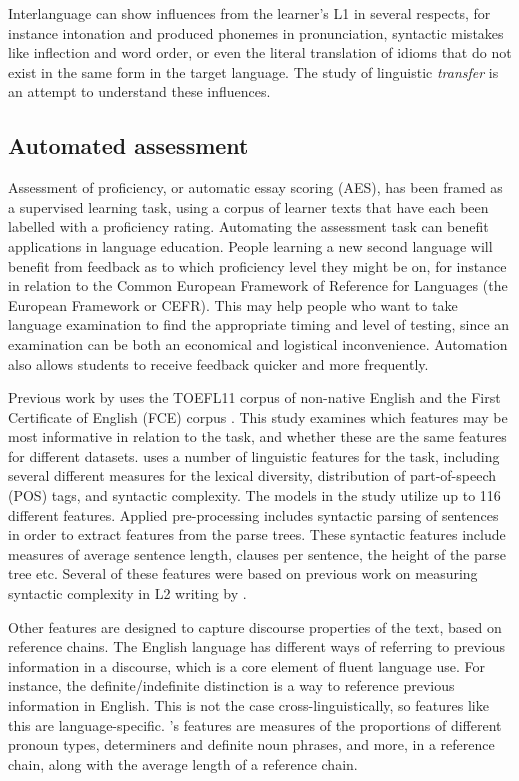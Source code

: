 Interlanguage can show influences from the learner's L1 in several respects,
for instance intonation and produced phonemes in pronunciation, syntactic
mistakes like inflection and word order, or even the literal translation of
idioms that do not exist in the same form in the target language. The study
of linguistic \emph{transfer} is an attempt to understand these influences.


\subsection{Automated assessment}

Assessment of proficiency, or automatic essay scoring (AES), has been framed
as a supervised learning task, using a corpus of learner texts that have each
been labelled with a proficiency rating. Automating the assessment task can
benefit applications in language education. People learning a new second
language will benefit from feedback as to which proficiency level they might
be on, for instance in relation to the Common European Framework of Reference
for Languages (the European Framework or CEFR). This may help people who want
to take language examination to find the appropriate timing and level of
testing, since an examination can be both an economical and logistical
inconvenience. Automation also allows students to receive feedback quicker
and more frequently.

Previous work by \textcite{vajjala17} uses the TOEFL11 corpus of non-native
English \autocite{blanchard13} and the First Certificate of English (FCE)
corpus \autocite{yannakoudakis2011new}. This study examines which features
may be most informative in relation to the task, and whether these are the
same features for different datasets. \citeauthor{vajjala17} uses a number of
linguistic features for the task, including several different measures for
the lexical diversity, distribution of part-of-speech (POS) tags, and
syntactic complexity. The models in the study utilize up to 116 different
features. Applied pre-processing includes syntactic parsing of sentences in
order to extract features from the parse trees. These syntactic features
include measures of average sentence length, clauses per sentence, the height
of the parse tree etc. Several of these features were based on previous work
on measuring syntactic complexity in L2 writing by
\textcite{lu2010automatic}.

Other features are designed to capture discourse properties of the text,
based on reference chains. The English language has different ways of
referring to previous information in a discourse, which is a core element of
fluent language use. For instance, the definite/indefinite distinction is a
way to reference previous information in English. This is not the case
cross-linguistically, so features like this are language-specific.
\citeauthor{vajjala17}'s features are measures of the proportions of
different pronoun types, determiners and definite noun phrases, and more, in
a reference chain, along with the average length of a reference chain.

